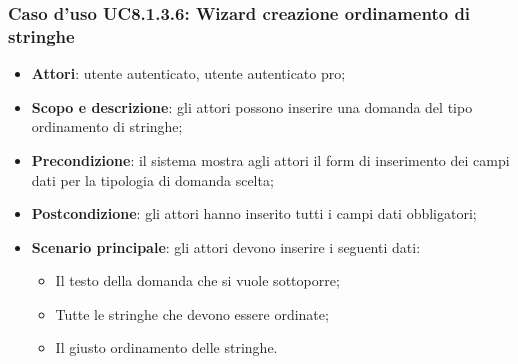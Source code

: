 \subsubsection{Caso d’uso UC8.1.3.6: Wizard creazione ordinamento di stringhe}
\begin{itemize}
	\item\textbf{Attori}: utente autenticato, utente autenticato pro;
	\item\textbf{Scopo e descrizione}: gli attori possono inserire una domanda del tipo ordinamento di stringhe;
	\item\textbf{Precondizione}: il sistema mostra agli attori il form di inserimento dei campi dati per la tipologia di domanda scelta; 
	\item \textbf{Postcondizione}: gli attori hanno inserito tutti i campi dati obbligatori;
	\item\textbf{Scenario principale}: gli attori devono inserire i seguenti dati:
	\begin{itemize}
		\item Il testo della domanda che si vuole sottoporre;
		\item Tutte le stringhe che devono essere ordinate;
		\item Il giusto ordinamento delle stringhe.
	\end{itemize}
\end{itemize}